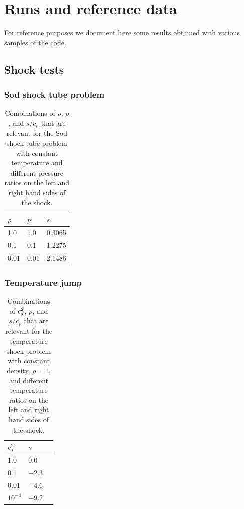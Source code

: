 \documentclass[\mydriver,12pt,twoside,notitlepage,a4paper]{article}
\begin{document}
\section{Runs and reference data}
\label{S-ref-data}

For reference purposes we document here some results obtained with various
samples of the code.


\subsection{Shock tests}

\subsubsection{Sod shock tube problem}

\begin{table}[htb]
  \begin{center}
    \caption{
        Combinations of $\rho$, $p$, and $s/c_p$ that are relevant
        for the Sod shock tube problem with constant temperature
        and different pressure ratios on the left and right hand
        sides of the shock.
    }
    \label{Tshock1}
    \begin{tabular}{lll}
    \toprule
$\rho$  &  $p$  &  $s$  \\
    \midrule
   1.0  &  1.0  &  0.3065  \\
   0.1  &  0.1  &  1.2275  \\
   0.01 &  0.01 &  2.1486  \\
    \bottomrule
    \end{tabular}
  \end{center}
\end{table}

\subsubsection{Temperature jump}

\begin{table}[htb]
  \begin{center}
    \caption{
        Combinations of $c_{\rm s}^2$, $p$, and $s/c_p$ that are
        relevant for the temperature shock problem with constant density,
        $\rho=1$, and different temperature ratios on the left and
        right hand sides of the shock.
    }
    \label{Tshock2}
    \begin{tabular}{lll}
    \toprule
$c_{\rm s}^2$  &  $s$  \\
    \midrule
   1.0    &$ 0.0$ \\
   0.1    &$-2.3$ \\
   0.01   &$-4.6$ \\
$10^{-4}$ &$-9.2$ \\
    \bottomrule
    \end{tabular}
  \end{center}
\end{table}
\end{document}
